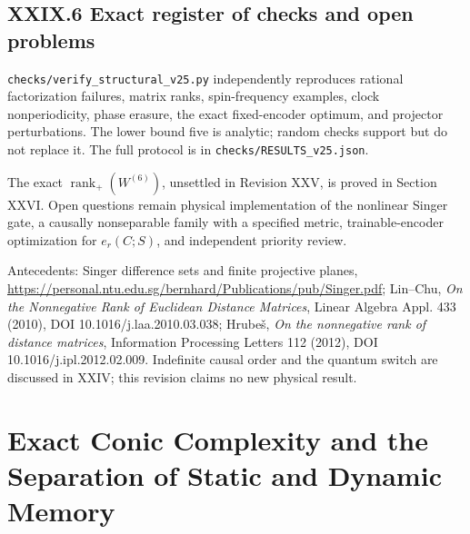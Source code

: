 \documentclass[11pt,a4paper,oneside]{book}
\DeclareMathOperator{\rank}{rank}\DeclareMathOperator{\Tr}{Tr}
\begin{document}
\section*{XXIX.6 Exact register of checks and open problems}
\texttt{checks/verify\_structural\_v25.py} independently reproduces rational factorization failures, matrix ranks, spin-frequency examples, clock nonperiodicity, phase erasure, the exact fixed-encoder optimum, and projector perturbations. The lower bound five is analytic; random checks support but do not replace it. The full protocol is in \texttt{checks/RESULTS\_v25.json}.

The exact $\rank_+(W^{(6)})$, unsettled in Revision XXV, is proved in Section XXVI. Open questions remain physical implementation of the nonlinear Singer gate, a causally nonseparable family with a specified metric, trainable-encoder optimization for $e_r(C;S)$, and independent priority review.

Antecedents: Singer difference sets and finite projective planes, \url{https://personal.ntu.edu.sg/bernhard/Publications/pub/Singer.pdf}; Lin--Chu, \textit{On the Nonnegative Rank of Euclidean Distance Matrices}, Linear Algebra Appl. 433 (2010), DOI 10.1016/j.laa.2010.03.038; Hrube\v s, \textit{On the nonnegative rank of distance matrices}, Information Processing Letters 112 (2012), DOI 10.1016/j.ipl.2012.02.009. Indefinite causal order and the quantum switch are discussed in XXIV; this revision claims no new physical result.
\chapter{Exact Conic Complexity and the Separation of Static and Dynamic Memory}
\end{document}

